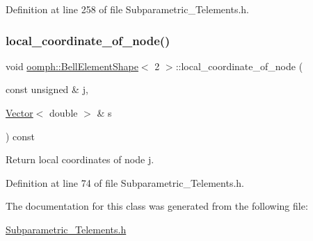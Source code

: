 Definition at line 258 of file Subparametric\+\_\+\+Telements.\+h.

\mbox{\label{classoomph_1_1BellElementShape_3_012_01_4_ad9b2789592d62d6d08c121d795921dd8}} 
\subsubsection{\texorpdfstring{local\+\_\+coordinate\+\_\+of\+\_\+node()}{local\_coordinate\_of\_node()}}
{\footnotesize\ttfamily void \hyperlink{classoomph_1_1BellElementShape}{oomph\+::\+Bell\+Element\+Shape}$<$ 2 $>$\+::local\+\_\+coordinate\+\_\+of\+\_\+node (\begin{DoxyParamCaption}\item[{const unsigned \&}]{j,  }\item[{\hyperlink{classoomph_1_1Vector}{Vector}$<$ double $>$ \&}]{s }\end{DoxyParamCaption}) const\hspace{0.3cm}{\ttfamily [inline]}}



Return local coordinates of node j. 



Definition at line 74 of file Subparametric\+\_\+\+Telements.\+h.



The documentation for this class was generated from the following file\+:\begin{DoxyCompactItemize}
\item 
\hyperlink{Subparametric__Telements_8h}{Subparametric\+\_\+\+Telements.\+h}\end{DoxyCompactItemize}

